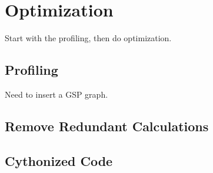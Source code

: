 \section{Optimization}
Start with the profiling, then do optimization.

\subsection{Profiling}

Need to insert a GSP graph.

\subsection{Remove Redundant Calculations}

\subsection{Cythonized Code}